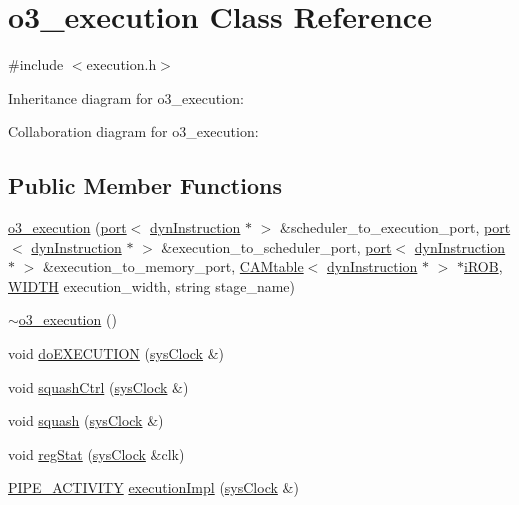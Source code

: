 \hypertarget{classo3__execution}{
\section{o3\_\-execution Class Reference}
\label{classo3__execution}
}


{\ttfamily \#include $<$execution.h$>$}



Inheritance diagram for o3\_\-execution:


Collaboration diagram for o3\_\-execution:
\subsection*{Public Member Functions}
\begin{DoxyCompactItemize}
\item 
\hyperlink{classo3__execution_aa727dbc0730a04adac30d57796c7c769}{o3\_\-execution} (\hyperlink{classport}{port}$<$ \hyperlink{classdynInstruction}{dynInstruction} $\ast$ $>$ \&scheduler\_\-to\_\-execution\_\-port, \hyperlink{classport}{port}$<$ \hyperlink{classdynInstruction}{dynInstruction} $\ast$ $>$ \&execution\_\-to\_\-scheduler\_\-port, \hyperlink{classport}{port}$<$ \hyperlink{classdynInstruction}{dynInstruction} $\ast$ $>$ \&execution\_\-to\_\-memory\_\-port, \hyperlink{classCAMtable}{CAMtable}$<$ \hyperlink{classdynInstruction}{dynInstruction} $\ast$ $>$ $\ast$\hyperlink{backend_2parser_8cpp_ad73ae25f81e6e99482f3fbd5ba9664ce}{iROB}, \hyperlink{global_2global_8h_a6fa2e24b8a418fa215e183264cbea3aa}{WIDTH} execution\_\-width, string stage\_\-name)
\item 
\hyperlink{classo3__execution_a33a63fc56bf57ef6a470fbad5af5efcc}{$\sim$o3\_\-execution} ()
\item 
void \hyperlink{classo3__execution_ad3e4a2e10bfcad9fa8c73b77c3b9fffb}{doEXECUTION} (\hyperlink{classsysClock}{sysClock} \&)
\item 
void \hyperlink{classo3__execution_a590c0557a738cccb6ef7d8234743aa6f}{squashCtrl} (\hyperlink{classsysClock}{sysClock} \&)
\item 
void \hyperlink{classo3__execution_a38bcffde43ee6d4935c251b47e52a85c}{squash} (\hyperlink{classsysClock}{sysClock} \&)
\item 
void \hyperlink{classo3__execution_aef41940af13033c3736d7b6627efd39f}{regStat} (\hyperlink{classsysClock}{sysClock} \&clk)
\item 
\hyperlink{unit_2stage_8h_ab00e4188e8b8974fecb1dfd12764cbb1}{PIPE\_\-ACTIVITY} \hyperlink{classo3__execution_a2565c18ef20ce1e0ff72f5399831075a}{executionImpl} (\hyperlink{classsysClock}{sysClock} \&)

\end{DoxyCompactItemize}
